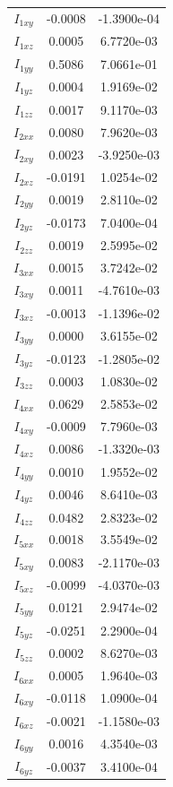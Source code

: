 \documentclass{article}
\begin{document}
\begin{table}
\begin{center}
\begin{tabular}{|c|cc|}
$ I_{1xy} $ & -0.0008 & -1.3900e-04\\
$ I_{1xz} $ & 0.0005 & 6.7720e-03\\
$ I_{1yy} $ & 0.5086 & 7.0661e-01\\
$ I_{1yz} $ & 0.0004 & 1.9169e-02\\
$ I_{1zz} $ & 0.0017 & 9.1170e-03\\
$ I_{2xx} $ & 0.0080 & 7.9620e-03\\
$ I_{2xy} $ & 0.0023 & -3.9250e-03\\
$ I_{2xz} $ & -0.0191 & 1.0254e-02\\
$ I_{2yy} $ & 0.0019 & 2.8110e-02\\
$ I_{2yz} $ & -0.0173 & 7.0400e-04\\
$ I_{2zz} $ & 0.0019 & 2.5995e-02\\
$ I_{3xx} $ & 0.0015 & 3.7242e-02\\
$ I_{3xy} $ & 0.0011 & -4.7610e-03\\
$ I_{3xz} $ & -0.0013 & -1.1396e-02\\
$ I_{3yy} $ & 0.0000 & 3.6155e-02\\
$ I_{3yz} $ & -0.0123 & -1.2805e-02\\
$ I_{3zz} $ & 0.0003 & 1.0830e-02\\
$ I_{4xx} $ & 0.0629 & 2.5853e-02\\
$ I_{4xy} $ & -0.0009 & 7.7960e-03\\
$ I_{4xz} $ & 0.0086 & -1.3320e-03\\
$ I_{4yy} $ & 0.0010 & 1.9552e-02\\
$ I_{4yz} $ & 0.0046 & 8.6410e-03\\
$ I_{4zz} $ & 0.0482 & 2.8323e-02\\
$ I_{5xx} $ & 0.0018 & 3.5549e-02\\
$ I_{5xy} $ & 0.0083 & -2.1170e-03\\
$ I_{5xz} $ & -0.0099 & -4.0370e-03\\
$ I_{5yy} $ & 0.0121 & 2.9474e-02\\
$ I_{5yz} $ & -0.0251 & 2.2900e-04\\
$ I_{5zz} $ & 0.0002 & 8.6270e-03\\
$ I_{6xx} $ & 0.0005 & 1.9640e-03\\
$ I_{6xy} $ & -0.0118 & 1.0900e-04\\
$ I_{6xz} $ & -0.0021 & -1.1580e-03\\
$ I_{6yy} $ & 0.0016 & 4.3540e-03\\
$ I_{6yz} $ & -0.0037 & 3.4100e-04\\

\end{tabular}
\end{center}
\end{table}
\end{document}
